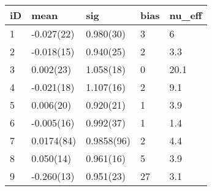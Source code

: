 
\begin{tabular}{l|l|l|l|l}
\hline
iD & mean & sig & bias & nu\_eff\\
\hline
1 & -0.027(22) & 0.980(30) & 3 & 6\\
\hline
2 & -0.018(15) & 0.940(25) & 2 & 3.3\\
\hline
3 & 0.002(23) & 1.058(18) & 0 & 20.1\\
\hline
4 & -0.021(18) & 1.107(16) & 2 & 9.1\\
\hline
5 & 0.006(20) & 0.920(21) & 1 & 3.9\\
\hline
6 & -0.005(16) & 0.992(37) & 1 & 1.4\\
\hline
7 & 0.0174(84) & 0.9858(96) & 2 & 4.4\\
\hline
8 & 0.050(14) & 0.961(16) & 5 & 3.9\\
\hline
9 & -0.260(13) & 0.951(23) & 27 & 3.1\\
\hline
\end{tabular}
